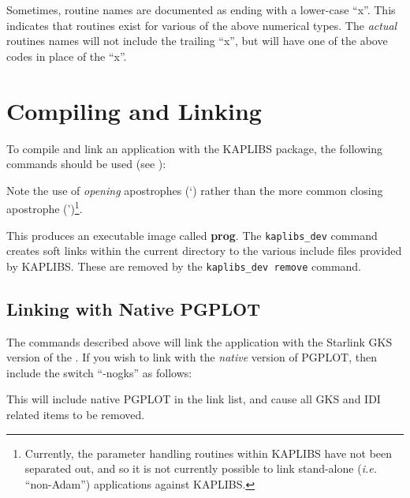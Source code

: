 \documentclass[11pt]{starlink}
\begin{document}
Sometimes, routine names are documented as ending with a lower-case
``x''. This indicates that routines exist for various of the above
numerical types. The \emph{actual} routines names will not include the trailing
``x'', but will have one of the above codes in place of the ``x''.

\section{Compiling and Linking}
To compile and link an application with the KAPLIBS package, the following
commands should be used (see ):

\begin{small}
\begin{terminalv}
\end{terminalv}
\end{small}

Note the use of \emph{opening} apostrophes (`) rather than the more common
closing apostrophe (')\footnote{Currently, the parameter handling
routines within KAPLIBS have not been separated out, and so it is not
currently possible to link stand-alone (\emph{i.e.} ``non-Adam'')
applications against KAPLIBS.}.

This produces an executable image called {\bf prog}. The
\verb+kaplibs_dev+ command creates soft links within the current
directory to the various include files provided by KAPLIBS. These are
removed by the \verb+kaplibs_dev remove+ command.

\subsection{Linking with Native PGPLOT}
The commands described above will link the application with the Starlink
GKS version of the . If you wish
to link with the \emph{native} version of PGPLOT, then include the switch
``-nogks'' as follows:

\begin{small}
\begin{terminalv}
\end{terminalv}
\end{small}

This will include native PGPLOT in the link list, and cause all GKS and IDI
related items to be removed.

\newpage
\appendix
\end{document}
